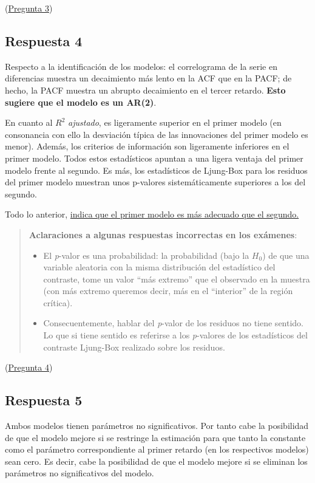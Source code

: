 \documentclass[10pt]{article}
\begin{document}
(\hyperref[sec:orga9286f5]{Pregunta 3})
\subsection*{Respuesta 4}
\label{sec:org8637613}

Respecto a la identificación de los modelos: el correlograma de la
serie en diferencias muestra un decaimiento más lento en la ACF que en
la PACF; de hecho, la PACF muestra un abrupto decaimiento en el tercer
retardo. \textbf{Esto sugiere que el modelo es un AR(2)}.

En cuanto al \(R^2\) \emph{ajustado}, es ligeramente superior en el primer
modelo (en consonancia con ello la desviación típica de las
innovaciones del primer modelo es menor). Además, los criterios de
información son ligeramente inferiores en el primer modelo. Todos
estos estadísticos apuntan a una ligera ventaja del primer modelo
frente al segundo. Es más, los estadísticos de Ljung-Box para los
residuos del primer modelo muestran unos p-valores sistemáticamente
superiores a los del segundo. 

Todo lo anterior, \uline{indica que el primer modelo es más adecuado que el
segundo.}

\begin{quote}
\textbf{Aclaraciones a algunas respuestas incorrectas en los exámenes}:

\begin{itemize}
\item El \emph{p}-valor es una probabilidad: la probabilidad (bajo la \(H_0\)) de
que una variable aleatoria con la misma distribución del estadístico
del contraste, tome un valor ``más extremo'' que el observado en la
muestra (con más extremo queremos decir, más en el ``interior'' de
la región crítica).

\item Consecuentemente, hablar del \emph{p}-valor de los residuos no tiene
sentido. Lo que si tiene sentido es referirse a los \emph{p}-valores de
los estadísticos del contraste Ljung-Box realizado sobre los
residuos.
\end{itemize}
\end{quote}


(\hyperref[sec:orgcb53583]{Pregunta 4})
\subsection*{Respuesta 5}
\label{sec:orge425bc0}

Ambos modelos tienen parámetros no significativos. Por tanto cabe la
posibilidad de que el modelo mejore si se restringe la estimación para
que tanto la constante como el parámetro correspondiente al primer
retardo (en los respectivos modelos) sean cero. Es decir, cabe la
posibilidad de que el modelo mejore si se eliminan los parámetros no
significativos del modelo.
\end{document}
